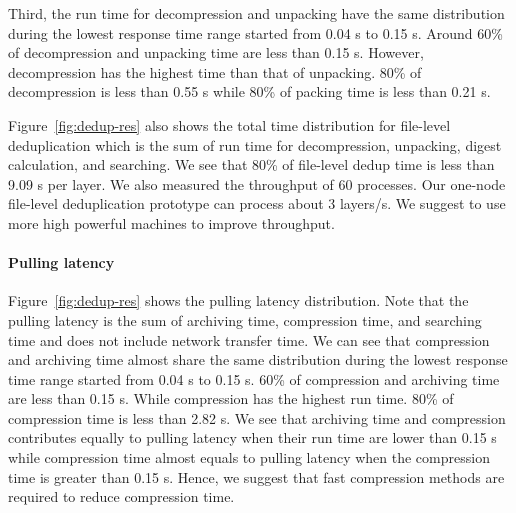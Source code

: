 Third, the run time for decompression and unpacking have the same distribution
during the lowest response time range started from 0.04 s to 0.15 s. Around
60\% of decompression and unpacking time are less than 0.15 s. However,
decompression has the highest time than that of unpacking. 80\% of
decompression is less than 0.55 s while 80\% of packing time is less than 0.21 s. 

Figure~\ref{fig:dedup-res} also shows the total time distribution for
file-level deduplication which is the sum of run time for decompression, unpacking,
digest calculation, and searching. We see that 80\% of file-level dedup time is
less than 9.09 s per layer.
%
%
We also measured the throughput of 60 processes. Our one-node file-level
deduplication prototype can process about 3 layers/s. We suggest to use more
high powerful machines to improve throughput.

\paragraph{Pulling latency} Figure~\ref{fig:dedup-res} shows the pulling latency
distribution. Note that the pulling latency is the sum of archiving time,
compression time, and searching time and does not include network transfer
time. We can see that compression and archiving time almost share the same
distribution during the lowest response time range started from 0.04 s to 0.15
s. 60\% of compression and archiving time are less than 0.15 s. While
compression has the highest run time. 80\% of compression time is less than 2.82
s. We see that archiving time and compression contributes equally to pulling
latency when their run time are lower than 0.15 s while compression time almost
equals to pulling latency when the compression time is greater than 0.15 s. Hence, we
suggest that fast compression methods are required to reduce compression time.  
%


%
%

%
%
%

